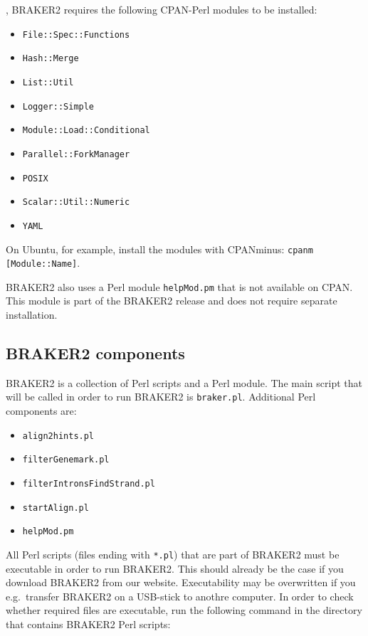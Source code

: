 \documentclass[a4paper,10pt]{report}
\begin{document}
, BRAKER2 requires the following CPAN-Perl modules to be installed:

\begin{itemize}
 \item 		  \texttt{File::Spec::Functions}
				\item \texttt{Hash::Merge}
				\item \texttt{List::Util}
				\item \texttt{Logger::Simple}
				\item \texttt{Module::Load::Conditional}
				\item \texttt{Parallel::ForkManager}
				\item \texttt{POSIX}
				\item \texttt{Scalar::Util::Numeric}
				\item \texttt{YAML}
\end{itemize}

   	On Ubuntu, for example, install the modules with CPANminus: \texttt{cpanm [Module::Name]}.

   BRAKER2 also uses a Perl module \texttt{helpMod.pm} that is not available on CPAN. This module is 
   part of the BRAKER2 release and does not require separate installation.  

\subsection{BRAKER2 components} \label{Executability}

BRAKER2 is a collection of Perl scripts and a Perl module. The main script that will be called in order to run BRAKER2 is \texttt{braker.pl}. Additional Perl components are:

\begin{itemize}
\item \texttt{align2hints.pl}
\item \texttt{filterGenemark.pl}
\item \texttt{filterIntronsFindStrand.pl}
\item \texttt{startAlign.pl}
\item \texttt{helpMod.pm}
\end{itemize}

All Perl scripts (files ending with \texttt{*.pl}) that are part of BRAKER2 must be executable in order to run BRAKER2. This should already be the case if you download BRAKER2 from our website. Executability may be overwritten if you e.g.~transfer BRAKER2 on a USB-stick to anothre computer. In order to check whether required files are executable, run the following command in the directory that contains BRAKER2 Perl scripts:
\end{document}
